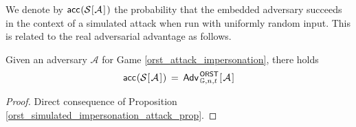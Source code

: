 \documentclass{iacrtrans}
\begin{document}
\noindent
We denote by
$
\mathsf{acc}\hspace{0.5pt}(
	\mathcal{S}
	\hspace{0.5pt}
	[
		\hspace{0.5pt}
		\mathcal{A}
		\hspace{1pt}
	]
	\hspace{1pt})
$
the probability that the embedded adversary
succeeds in the context of a simulated attack
when run with uniformly random input.
This is related to the real adversarial advantage
as follows.

\begin{cor}\label{equality_intermediate}
Given an adversary $\mathcal{A}$
for Game \textup{\ref{orst_attack_impersonation}},
there holds
\vspace{5pt}
\begin{equation}
	\mathsf{acc}\hspace{0.5pt}(
		\mathcal{S}
		\hspace{0.5pt}[
			\hspace{1pt}
			\mathcal{A}
			\hspace{1pt}
		]\hspace{0.5pt}
	)
	\hspace{2pt}
	=
	\hspace{2pt}
	\mathsf{Adv}
		_{\hspace{1pt}\mathbb{G}, n, t}
		^{\hspace{1pt}\mathsf{ORST}}\hspace{0.5pt}
		[
			\hspace{1pt}
			\mathcal{A}
			\hspace{1pt}
		]
\vspace{5pt}
\end{equation}
\end{cor}

\begin{proof}
Direct consequence of Proposition
\ref{orst_simulated_impersonation_attack_prop}.
\end{proof}
\end{document}
